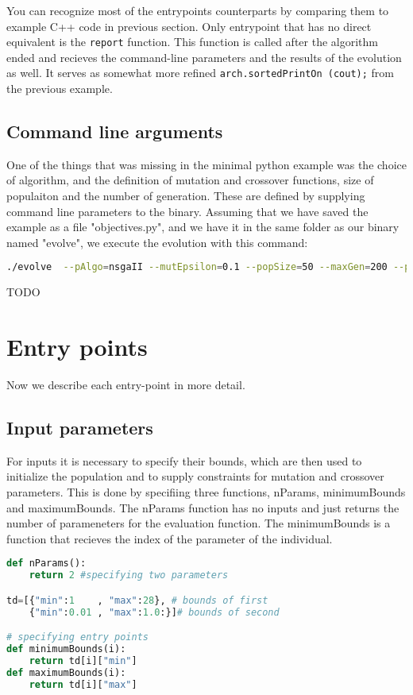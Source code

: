 \documentclass[12pt,oneside]{fithesis2}
\begin{document}
You can recognize most of the entrypoints counterparts by comparing them to example C++ code in previous section. 
Only entrypoint that has no direct equivalent is the \lstinline$report$ function. This function is called after the algorithm ended and recieves the command-line parameters and the results of the evolution as well. It serves as somewhat more refined  \lstinline$arch.sortedPrintOn (cout);$ from the previous example.

\subsection{Command line arguments}
One of the things that was missing in the minimal python example was the choice of algorithm, and the definition of mutation and crossover functions, size of populaiton and the number of generation. These are defined by supplying command line parameters to the binary. Assuming that we have saved the example as a file "objectives.py", and we have it in the same folder as our binary named "evolve", we execute the evolution with this command:

\begin{lstlisting}[language=Bash,label=min_example,caption=Minimal working example]
./evolve  --pAlgo=nsgaII --mutEpsilon=0.1 --popSize=50 --maxGen=200 --pMut=1 --mutProb=0.01 --pCross=0.01 --crossProb=0.5
\end{lstlisting}
TODO
\section{Entry points}

Now we describe each entry-point in more detail.

\subsection{Input parameters}
For inputs it is necessary to specify their bounds, which are then used to initialize the population and to supply constraints for mutation and crossover parameters. This is done by specifiing three functions, nParams, minimumBounds and maximumBounds. 
The nParams function has no inputs and just returns the number of parameneters for the evaluation function. 
The minimumBounds is a function that recieves the index of the parameter of the individual.

\begin{lstlisting}[language=Python,label=inp_example,caption=Inputs]
def nParams():
	return 2 #specifying two parameters

td=[{"min":1    , "max":28}, # bounds of first 
    {"min":0.01 , "max":1.0:}]# bounds of second

# specifying entry points
def minimumBounds(i):
	return td[i]["min"] 
def maximumBounds(i):
	return td[i]["max"]
\end{lstlisting}
\end{document}
